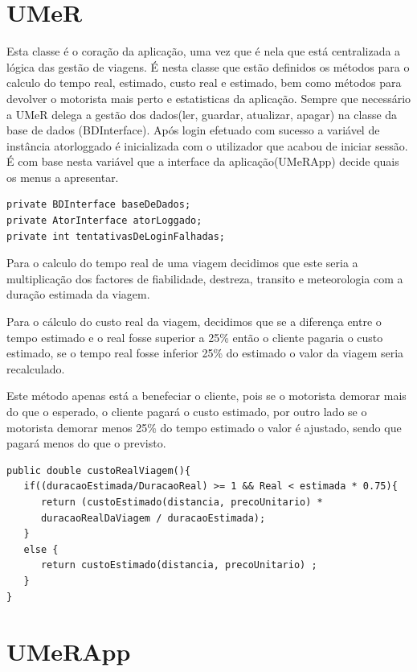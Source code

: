 \section{UMeR}

Esta classe é o coração da aplicação, uma vez que é nela que está centralizada a lógica das gestão de viagens. É nesta classe que estão definidos os métodos para o calculo do tempo real, estimado, custo real e estimado, bem como métodos para devolver o motorista mais perto e estatisticas da aplicação. Sempre que necessário a UMeR delega a gestão dos dados(ler, guardar, atualizar, apagar) na classe da base de dados (BDInterface). 
Após login efetuado com sucesso a variável de instância atorloggado é inicializada com o utilizador que acabou de iniciar sessão. É com base nesta variável que a interface da aplicação(UMeRApp) decide quais os menus a apresentar.  

\begin{verbatim}
private BDInterface baseDeDados;
private AtorInterface atorLoggado;
private int tentativasDeLoginFalhadas;
\end{verbatim}


Para o calculo do tempo real de uma viagem decidimos que este seria a multiplicação dos factores de fiabilidade, destreza, transito e meteorologia com a duração estimada da viagem. 


Para o cálculo do custo real da viagem, decidimos que se a diferença entre o tempo estimado e o real fosse superior a 25\% então o cliente pagaria o custo estimado, se o tempo real fosse inferior 25\% do estimado o valor da viagem seria recalculado. 

Este método apenas está a benefeciar o cliente, pois se o motorista demorar mais do que o esperado, o cliente pagará o custo estimado, por outro lado se o motorista demorar menos 25\% do tempo estimado o valor é ajustado, sendo que pagará menos do que o previsto. 

\begin{verbatim}
public double custoRealViagem(){
   if((duracaoEstimada/DuracaoReal) >= 1 && Real < estimada * 0.75){
      return (custoEstimado(distancia, precoUnitario) * 
      duracaoRealDaViagem / duracaoEstimada);
   }
   else {
      return custoEstimado(distancia, precoUnitario) ;
   }  
}
\end{verbatim}

\section{UMeRApp}

